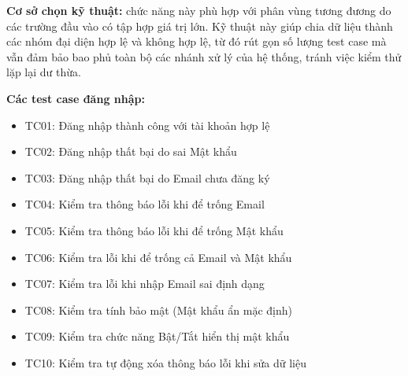 \textbf{Cơ sở chọn kỹ thuật:} chức năng này phù hợp với phân vùng tương đương do các trường đầu vào có tập hợp giá trị lớn. Kỹ thuật này giúp chia dữ liệu thành các nhóm đại diện hợp lệ và không hợp lệ, từ đó rút gọn số lượng test case mà vẫn đảm bảo bao phủ toàn bộ các nhánh xử lý của hệ thống, tránh việc kiểm thử lặp lại dư thừa.

\textbf{Các test case đăng nhập:}
\begin{itemize}
	\item TC01: Đăng nhập thành công với tài khoản hợp lệ
	\item TC02: Đăng nhập thất bại do sai Mật khẩu
	\item TC03: Đăng nhập thất bại do Email chưa đăng ký
	\item TC04: Kiểm tra thông báo lỗi khi để trống Email
	\item TC05: Kiểm tra thông báo lỗi khi để trống Mật khẩu
	\item TC06: Kiểm tra lỗi khi để trống cả Email và Mật khẩu
	\item TC07: Kiểm tra lỗi khi nhập Email sai định dạng
	\item TC08: Kiểm tra tính bảo mật (Mật khẩu ẩn mặc định)
	\item TC09: Kiểm tra chức năng Bật/Tắt hiển thị mật khẩu
	\item TC10: Kiểm tra tự động xóa thông báo lỗi khi sửa dữ liệu
\end{itemize}

